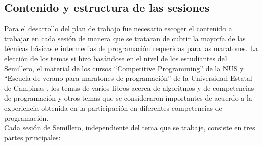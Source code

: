 \documentclass[conference]{IEEEtran}
\begin{document}
	\subsection{Contenido y estructura de las sesiones}
	Para el desarrollo del plan de trabajo fue necesario escoger el contenido a trabajar en cada sesión de manera que se trataran de cubrir la mayoría de las técnicas básicas e intermedias de programación requeridas para las maratones. La elección de los temas si hizo basándose en el nivel de los estudiantes del Semillero, el material de los cursos ``Competitive Programming'' de la NUS \cite{CourseNUS} y ``Escuela de verano para maratones de programación'' de la Universidad Estatal de Campinas \cite{Brasil}, los temas de varios libros acerca de algoritmos y de competencias de programación \cite{Cormen, ProgrammingChallenges, Halim, Halim2, ArtOfProgramming} y otros temas que se consideraron importantes de acuerdo a la experiencia obtenida en la participación en diferentes competencias de programación.\\
	Cada sesión de Semillero, independiente del tema que se trabaje, consiste en tres partes principales: 
\end{document}
